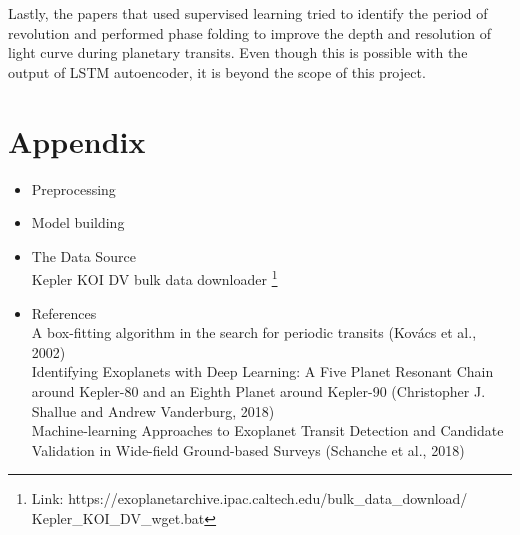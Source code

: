 \documentclass[%
aip,
amsmath,amssymb,
reprint,%
]{revtex4-1}
\begin{document}
Lastly, the papers that used supervised learning tried to identify the period of revolution and performed phase folding to improve the depth and resolution of light curve during planetary transits. Even though this is possible with the output of LSTM autoencoder, it is beyond the scope of this project.

\vspace{60 mm}
\section*{Appendix}

\begin{itemize}
\item Preprocessing
\end{itemize}



\begin{itemize}
\item Model building
\end{itemize}




\begin{itemize}
\item The Data Source\\
Kepler KOI DV bulk data downloader \footnote{Link: https://exoplanetarchive.ipac.caltech.edu/bulk\_data\_download/\\Kepler\_KOI\_DV\_wget.bat}

\item References \\
A box-fitting algorithm in the search for periodic transits (Kovács et al., 2002)\\
Identifying Exoplanets with Deep Learning: A Five Planet Resonant Chain around Kepler-80 and an Eighth Planet around Kepler-90 (Christopher J. Shallue and Andrew Vanderburg, 2018)\\
Machine-learning Approaches to Exoplanet Transit Detection and Candidate Validation in Wide-field Ground-based Surveys (Schanche et al., 2018)

\end{itemize}
\end{document}
